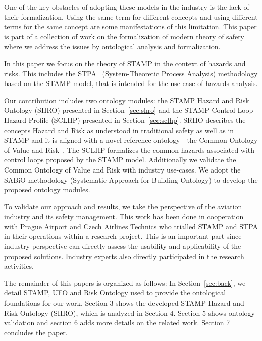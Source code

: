 \documentclass[sw]{iosart2x}
\newcommand{\sabio}[0]{SABiO}
\begin{document}
One of the key obstacles of adopting these models in the industry is the lack of their formalization. Using the same term for different concepts and using different terms for the same concept are some manifestations of this limitation. This paper is part of a collection of work on the formalization of modern theory of safety where we address the issues by ontological analysis and formalization. 

In this paper we focus on the theory of STAMP in the context of hazards and risks. This includes the STPA~\cite{leveson2012engineering} (System-Theoretic Process Analysis) methodology based on the STAMP model, that is intended for the use case of hazards analysis. 

Our contribution includes two ontology modules: the STAMP Hazard and Risk Ontology (SHRO) presented in Section~\ref{sec:shro} and the STAMP Control Loop Hazard Profile (SCLHP) presented in Section~\ref{sec:sclhp}. SRHO describes the concepts Hazard and Risk as understood in traditional safety as well as in STAMP and it is aligned with a novel reference ontology - the Common Ontology of Value and Risk~\cite{unknown}. The SCLHP formalizes the common hazards associated with control loops proposed by the STAMP model. Additionally we validate the Common Ontology of Value and Risk with industry use-cases. We adopt the \sabio{} methodology (Systematic Approach for Building Ontology) \cite{DeAlmeidaFalbo2014} to develop the proposed ontology modules. 

To validate our approach and results, we take the perspective of the aviation industry and its safety management. This work has been done in cooperation with Prague Airport and Czech Airlines Technics who trialled STAMP and STPA in their operations within a research project. This is an important part since industry perspective can directly assess the usability and applicability of the proposed solutions. Industry experts also directly participated in the research activities.

The remainder of this papers is organized as follows: In Section~\ref{sec:back}, we detail STAMP, UFO and Risk Ontology used to provide the ontological foundations for our work. Section 3 shows the developed STAMP Hazard and Risk Ontology (SHRO), which is analyzed in Section 4. Section 5 shows ontology validation and section 6 adds more details on the related work. Section 7 concludes the paper.

\end{document}
